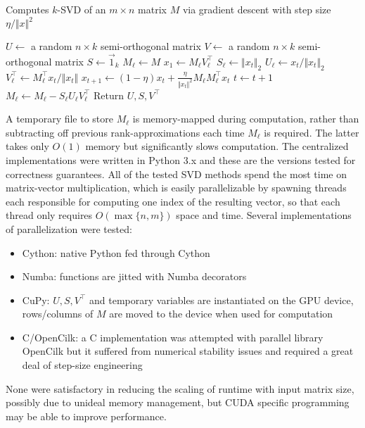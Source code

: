 \begin{algorithm}
\caption{Computes $k$-SVD of an $m\times n$ matrix $M$ via gradient descent with step size $\eta / \Vert x\Vert ^2$}\label{alg:gdsvd}
\begin{algorithmic}
    \State $U \gets$ a random $n \times k$ semi-orthogonal matrix
    \State $V \gets$ a random $n \times k$ semi-orthogonal matrix
    \State$S \gets \vec{1}_k$
    \State $M_\ell \gets M$
        \State $x_1\gets M_\ell V^\top_\ell$ 
            \State $S_\ell \gets \Vert x_t\Vert _2$
            \State $U_\ell \gets x_t/\Vert x_t\Vert _2$
            \State $V^\top_\ell \gets M_\ell^\top x_t/\Vert x_t\Vert$
            \State $x_{t+1} \gets (1-\eta)x_t + \frac{\eta}{\Vert x_t \Vert^2 } M_\ell M_\ell^\top x_t$
            \State $t\gets t+1$
        \EndWhile
        \State $M_\ell \gets M_\ell - S_\ell U_\ell V^\top_\ell$
    \EndFor
\State Return $U,S,V^\top$\;

\end{algorithmic}
\end{algorithm}

 A temporary file to store $M_\ell$ is memory-mapped during computation, rather than subtracting off previous rank-approximations each time $M_\ell$ is required. The latter takes only $O(1)$ memory but significantly slows computation. The centralized implementations were written in Python 3.x and these are the versions tested for correctness guarantees. All of the tested SVD methods spend the most time on matrix-vector multiplication, which is easily parallelizable by spawning threads each responsible for computing one index of the resulting vector, so that each thread only requires $O(\max\{n,m\})$ space and time. Several implementations of parallelization were tested:
\begin{itemize}
    \item Cython: native Python fed through Cython
    \item Numba: functions are jitted with Numba decorators
    \item CuPy: $U,S,V^\top$ and temporary variables are instantiated on the GPU device, rows/columns of $M$ are moved to the device when used for computation
    \item C/OpenCilk: a C implementation was attempted with parallel library OpenCilk but it suffered from numerical stability issues and required a great deal of step-size engineering
\end{itemize}
None were satisfactory in reducing the scaling of runtime with input matrix size, possibly due to unideal memory management, but CUDA specific programming may be able to improve performance.

